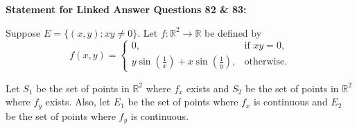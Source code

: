\documentclass{article}
\begin{document}
																																																																																																																												      \bigskip

																																																																																																																												      \textbf{Statement for Linked Answer Questions 82 \& 83:}

																																																																																																																												      Suppose $E = \{(x, y): xy \ne 0\}$. Let $f: \mathbb{R}^2 \rightarrow \mathbb{R}$ be defined by  
																																																																																																																												      \[
																																																																																																																												      f(x, y) =
																																																																																																																												      \begin{cases}
																																																																																																																												      0, & \text{if } xy = 0, \\
																																																																																																																												      y \sin\left(\frac{1}{x}\right) + x \sin\left(\frac{1}{y}\right), & \text{otherwise}.
																																																																																																																												      \end{cases}
																																																																																																																												      \]

																																																																																																																												      Let $S_1$ be the set of points in $\mathbb{R}^2$ where $f_x$ exists and $S_2$ be the set of points in $\mathbb{R}^2$ where $f_y$ exists. Also, let $E_1$ be the set of points where $f_x$ is continuous and $E_2$ be the set of points where $f_y$ is continuous.
\end{document}

